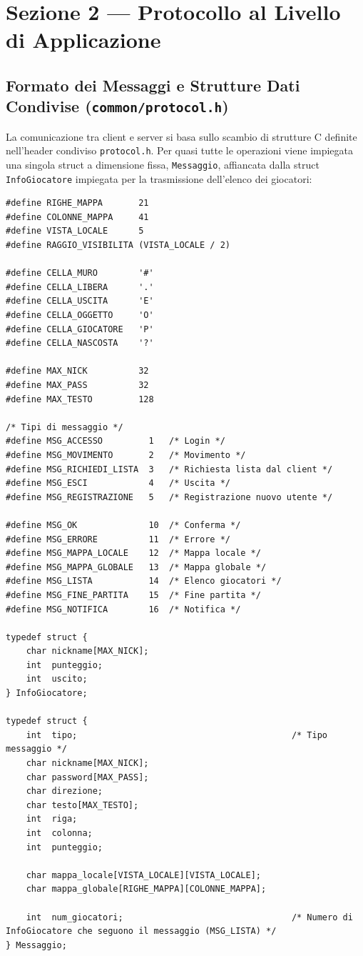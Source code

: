 \documentclass[11pt,a4paper]{article}
\begin{document}
\section{Sezione 2 --- Protocollo al Livello di Applicazione}

\subsection{Formato dei Messaggi e Strutture Dati Condivise (\texttt{common/protocol.h})}

La comunicazione tra client e server si basa sullo scambio di strutture C definite nell'header condiviso \texttt{protocol.h}. Per quasi tutte le operazioni viene impiegata una singola struct a dimensione fissa, \texttt{Messaggio}, affiancata dalla struct \texttt{InfoGiocatore} impiegata per la trasmissione dell'elenco dei giocatori:

\begin{lstlisting}[style=cstyle]
#define RIGHE_MAPPA       21
#define COLONNE_MAPPA     41
#define VISTA_LOCALE      5
#define RAGGIO_VISIBILITA (VISTA_LOCALE / 2)

#define CELLA_MURO        '#'
#define CELLA_LIBERA      '.'
#define CELLA_USCITA      'E'
#define CELLA_OGGETTO     'O'
#define CELLA_GIOCATORE   'P'
#define CELLA_NASCOSTA    '?'

#define MAX_NICK          32
#define MAX_PASS          32
#define MAX_TESTO         128

/* Tipi di messaggio */
#define MSG_ACCESSO         1   /* Login */
#define MSG_MOVIMENTO       2   /* Movimento */
#define MSG_RICHIEDI_LISTA  3   /* Richiesta lista dal client */
#define MSG_ESCI            4   /* Uscita */
#define MSG_REGISTRAZIONE   5   /* Registrazione nuovo utente */

#define MSG_OK              10  /* Conferma */
#define MSG_ERRORE          11  /* Errore */
#define MSG_MAPPA_LOCALE    12  /* Mappa locale */
#define MSG_MAPPA_GLOBALE   13  /* Mappa globale */
#define MSG_LISTA           14  /* Elenco giocatori */
#define MSG_FINE_PARTITA    15  /* Fine partita */
#define MSG_NOTIFICA        16  /* Notifica */

typedef struct {
    char nickname[MAX_NICK];
    int  punteggio;
    int  uscito;
} InfoGiocatore;

typedef struct {
    int  tipo;                                          /* Tipo messaggio */
    char nickname[MAX_NICK];                           
    char password[MAX_PASS];                           
    char direzione;                                    
    char testo[MAX_TESTO];                             
    int  riga;                                 
    int  colonna;                                   
    int  punteggio;                                     
    
    char mappa_locale[VISTA_LOCALE][VISTA_LOCALE];      
    char mappa_globale[RIGHE_MAPPA][COLONNE_MAPPA];    
    
    int  num_giocatori;                                 /* Numero di InfoGiocatore che seguono il messaggio (MSG_LISTA) */
} Messaggio;
\end{lstlisting}
\end{document}
